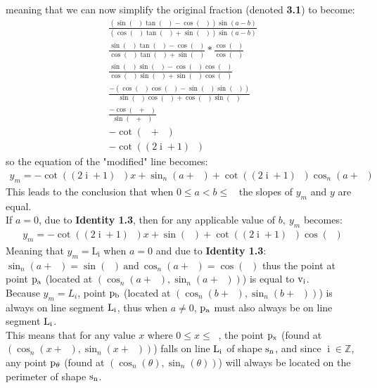 \documentclass[11pt]{article}
\DeclareMathOperator{\custi}{\mathrm{i}}
\DeclareMathOperator{\period}{\frac{2\pi}{n}}
\DeclareMathOperator{\hp}{\frac{\pi}{n}}
\DeclareMathOperator{\iperiod}{\custi\frac{2\pi}{n}}
\begin{document}
meaning that we can now simplify the original fraction (denoted \textbf{3.1}) to become:
\begin{gather*}
\frac{(\sin(\iperiod)\tan(\hp)-\cos(\iperiod))\sin(a-b)}{(\cos(\iperiod)\tan(\hp)+\sin(\iperiod))\sin(a-b)}\\
\frac{\sin(\iperiod)\tan(\hp)-\cos(\iperiod)}{\cos(\iperiod)\tan(\hp)+\sin(\iperiod)} * \frac{\cos(\hp)}{\cos(\hp)}\\
\frac{\sin(\iperiod)\sin(\hp)-\cos(\iperiod)\cos(\hp)}{\cos(\iperiod)\sin(\hp)+\sin(\iperiod)\cos(\hp)}\\
\frac{-(\cos(\iperiod)\cos(\hp)-\sin(\iperiod)\sin(\hp))}{\sin(\hp)\cos(\iperiod)+\cos(\hp)\sin(\iperiod)}\\
\frac{-\cos(\iperiod+\hp)}{\sin(\iperiod+\hp)}\\
-\cot(\iperiod+\hp)\\
-\cot((2\custi+1)\hp)
\end{gather*}
so the equation of the "modified" line becomes:
\begin{gather*}
y_m=-\cot((2\custi+1)\hp)x+\sin_n(a+\iperiod)+\cot((2\custi+1)\hp)\cos_n(a+\iperiod)
\end{gather*}
This leads to the conclusion that when \(0\leq a<b\leq\period\) the slopes of \(y_m\) and \(y\) are equal. \\
If \(a=0\), due to \textbf{Identity 1.3}, then for any applicable value of \(b,\ y_m\) becomes:
\begin{gather*}
y_m=-\cot((2\custi+1)\hp)x+\sin(\iperiod)+\cot((2\custi+1)\hp)\cos(\iperiod)
\end{gather*}
Meaning that \(y_m=\mathrm{L_i}\) when \(a=0\) and due to \textbf{Identity 1.3}: \(\sin_n(a+\iperiod)=\sin(\iperiod) \mathrm{\ and\ } \cos_n(a+\iperiod)=\cos(\iperiod)\) thus the point at point \(\rm p_a\) (located at \((\cos_n(a+\iperiod), \sin_n(a+\iperiod))\)) is equal to \(\rm v_i\).\\
Because \(y_m = L_i\), point \(\rm p_b\) (located at \((\cos_n(b+\iperiod),\sin_n(b+\iperiod))\)) is always on line segment \(\rm L_i\), thus when \(a\neq0\), \(\rm p_a\) must also always be on line segment \(\rm L_i\).\\
This means that for any value \(x\) where \(0\leq x \leq\period\), the point \(\rm p_x\) (found at \((\cos_n(x+\iperiod),\sin_n(x+\iperiod))\)) falls on line \(\rm L_i\) of shape \(\rm s_n\), and since \(\custi\in\mathbb{Z}\), any point \(\rm p_\theta\) (found at \((\cos_n(\theta),\sin_n(\theta))\)) will always be located on the perimeter of shape \(\rm s_n\).
\end{document}
